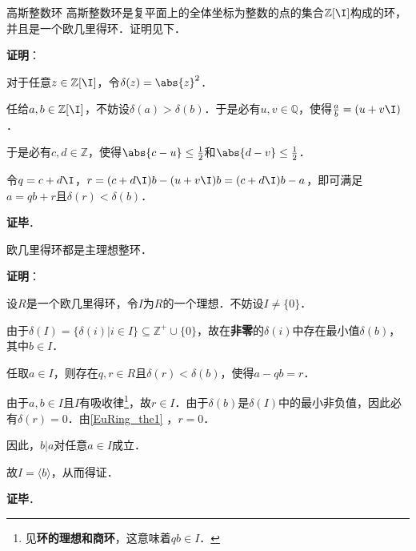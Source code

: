 \begin{example}{高斯整数环}
高斯整数环是复平面上的全体坐标为整数的点的集合$\mathbb{Z}[\I]$构成的环，并且是一个欧几里得环．证明见下．
\end{example}

\textbf{证明}：

对于任意$z\in\mathbb{Z}[\I]$，令$\delta(z)=\abs{z}^2$．

任给$a, b\in\mathbb{Z}[\I]$，不妨设$\delta(a)>\delta(b)$．于是必有$u, v\in\mathbb{Q}$，使得$\frac{a}{b}=(u+v\I)$．

于是必有$c, d\in\mathbb{Z}$，使得$\abs{c-u}\leq\frac{1}{2}$和$\abs{d-v}\leq\frac{1}{2}$．

令$q=c+d\I$，$r=(c+d\I)b-(u+v\I)b=(c+d\I)b-a$，即可满足$a=qb+r$且$\delta(r)<\delta(b)$．

\textbf{证毕}．

\begin{theorem}{}
欧几里得环都是主理想整环．
\end{theorem}

\textbf{证明}：

设$R$是一个欧几里得环，令$I$为$R$的一个理想．不妨设$I\not=\{0\}$．

由于$\delta(I)=\{\delta(i)|i\in I\}\subseteq\mathbb{Z}^+\cup\{0\}$，故在\textbf{非零}的$\delta(i)$中存在最小值$\delta(b)$，其中$b\in I$．

任取$a\in I$，则存在$q, r\in R$且$\delta(r)<\delta(b)$，使得$a-qb=r$．

由于$a, b\in I$且$I$有吸收律\footnote{见\textbf{环的理想和商环}，这意味着$qb\in I$．}，故$r\in I$．由于$\delta(b)$是$\delta(I)$中的最小非负值，因此必有$\delta(r)=0$．由\autoref{EuRing_the1} ，$r=0$．

因此，$b|a$对任意$a\in I$成立．

故$I=\langle b \rangle$，从而得证．

\textbf{证毕}．




